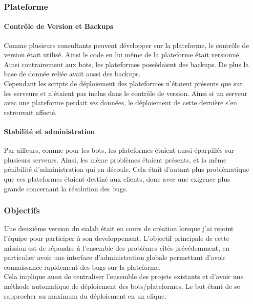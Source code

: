 \documentclass{article} %
\begin{document}
\subsubsection{Plateforme}

\paragraph{Contrôle de Version et Backups}
Comme plusieurs consultants peuvent développer sur la plateforme, le contrôle de version était utilisé. Ainsi le code en lui même de la plateforme était versionné. Ainsi contrairement aux bots, les plateformes possèdaient des backups. De plus la base de donnée reliée avait aussi des backups.\\
Cependant les scripts de déploiement des plateformes n'étaient présents que sur les serveurs et n'étaient pas inclus dans le contrôle de version. Ainsi si un serveur avec une plateforme perdait ses données, le déploiement de cette dernière s'en retrouvait affecté. \\

\paragraph{Stabilité et administration}
Par ailleurs, comme pour les bots, les plateformes étaient aussi éparpillés sur plusieurs serveurs. Ainsi, les même problèmes étaient présents, et la même pénibilité d'administration qui en découle. Cela était d'autant plus problématique que ces plateformes étaient destiné aux clients, donc avec une exigence plus grande concernant la résolution des bugs.

\subsubsection{Objectifs}
Une deuxième version du sialab était en cours de création lorsque j'ai rejoint l'équipe pour participer à son developpement. L'objectif principale de cette mission est de répondre à l'ensemble des problèmes cités précédemment, en particulier avoir une interface d'administration globale permettant d'avoir connaissance rapidement des bugs sur la plateforme.\\

Cela implique aussi de centraliser l'ensemble des projets existants et d'avoir une méthode automatique de déploiement des bots/plateformes. Le but étant de se rapprocher au maximum du déploiement en un clique.\\
\end{document}
